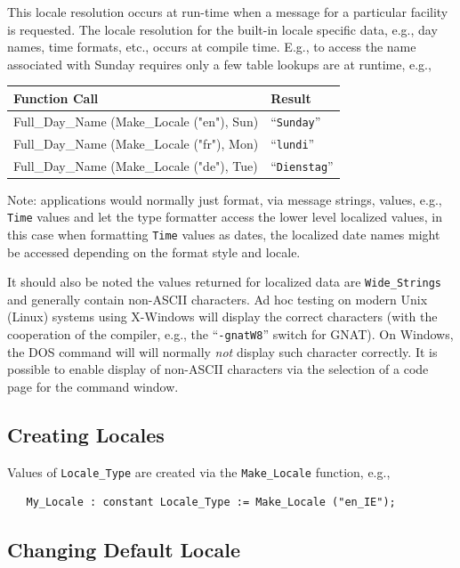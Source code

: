 This locale resolution occurs at run-time when a message for a particular
facility is requested.  The locale resolution for the built-in locale
specific data, e.g., day names, time formats, etc., occurs at compile time.
E.g., to access the name associated with Sunday requires only a few table
lookups are at runtime, e.g.,
\begin{center}
\begin{tabular}{ll}
Function Call & Result\\\hline
Full\_Day\_Name (Make\_Locale ("en"), Sun) & ``\texttt{Sunday}''\\
Full\_Day\_Name (Make\_Locale ("fr"), Mon) & ``\texttt{lundi}''\\
Full\_Day\_Name (Make\_Locale ("de"), Tue) & ``\texttt{Dienstag}''
\end{tabular}
\end{center}
Note: applications would normally just format, via message strings, values,
e.g., \texttt{Time} values and let the type formatter access the lower level
localized values, in this case when formatting \texttt{Time} values as dates,
the localized date names might be accessed depending on the format style and
locale.

It should also be noted the values returned for localized data are
\texttt{Wide\_Strings} and generally contain non-ASCII characters.  Ad hoc
testing on modern Unix (Linux) systems using X-Windows will display the correct
characters (with the cooperation of the compiler, e.g., the ``\texttt{-gnatW8}''
switch for GNAT).  On Windows, the DOS command will will normally {\em not}
display such character correctly.  It is possible to enable display of non-ASCII
characters via the selection of a code page for the command window.

\subsection{Creating Locales}

Values of \texttt{Locale\_Type} are created via the \texttt{Make\_Locale}
function, e.g.,
\begin{xmpl}
\begin{verbatim}
   My_Locale : constant Locale_Type := Make_Locale ("en_IE");
\end{verbatim}
\end{xmpl}

\subsection{Changing Default Locale}
\label{sec:changelocale}

